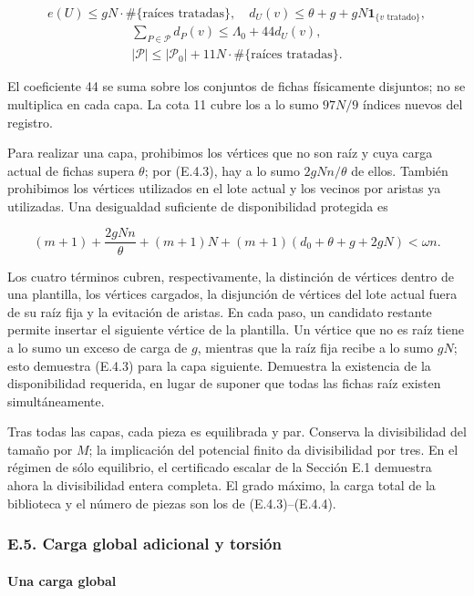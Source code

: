 \documentclass[spanish,11pt,a4paper]{article}
\begin{document}
\[e(U)\le gN\cdot\#\{\text{raíces tratadas}\},\quad
d_U(v)\le\theta+g+gN\mathbf1_{\{v\text{ tratado}\}},
\tag{E.4.3}\] \[\begin{gathered}
\sum_{P\in\mathcal P}d_P(v)\le\Lambda_0+44d_U(v),\\
|\mathcal P|\le|\mathcal P_0|+11N\cdot\#\{\text{raíces tratadas}\}.
\end{gathered}
\tag{E.4.4}\]

El coeficiente 44 se suma sobre los conjuntos de fichas físicamente disjuntos; no se multiplica en cada capa. La cota 11 cubre los a lo sumo \(97N/9\) índices nuevos del registro.

Para realizar una capa, prohibimos los vértices que no son raíz y cuya carga actual de fichas supera \(\theta\); por (E.4.3), hay a lo sumo \(2gNn/\theta\) de ellos. También prohibimos los vértices utilizados en el lote actual y los vecinos por aristas ya utilizadas. Una desigualdad suficiente de disponibilidad protegida es

\[(m+1)+\frac{2gNn}{\theta}+(m+1)N
+(m+1)(d_0+\theta+g+2gN)<\omega n.
\tag{E.4.5}\]

Los cuatro términos cubren, respectivamente, la distinción de vértices dentro de una plantilla, los vértices cargados, la disjunción de vértices del lote actual fuera de su raíz fija y la evitación de aristas. En cada paso, un candidato restante permite insertar el siguiente vértice de la plantilla. Un vértice que no es raíz tiene a lo sumo un exceso de carga de \(g\), mientras que la raíz fija recibe a lo sumo \(gN\); esto demuestra (E.4.3) para la capa siguiente. Demuestra la existencia de la disponibilidad requerida, en lugar de suponer que todas las fichas raíz existen simultáneamente.

Tras todas las capas, cada pieza es equilibrada y par. Conserva la divisibilidad del tamaño por \(M\); la implicación del potencial finito da divisibilidad por tres. En el régimen de sólo equilibrio, el certificado escalar de la Sección E.1 demuestra ahora la divisibilidad entera completa. El grado máximo, la carga total de la biblioteca y el número de piezas son los de (E.4.3)--(E.4.4).

\subsubsection{E.5. Carga global adicional y torsión}\label{e.5.-carga-global-adicional-y-torsiuxf3n}

\paragraph{Una carga global}\label{una-carga-global}
\end{document}
